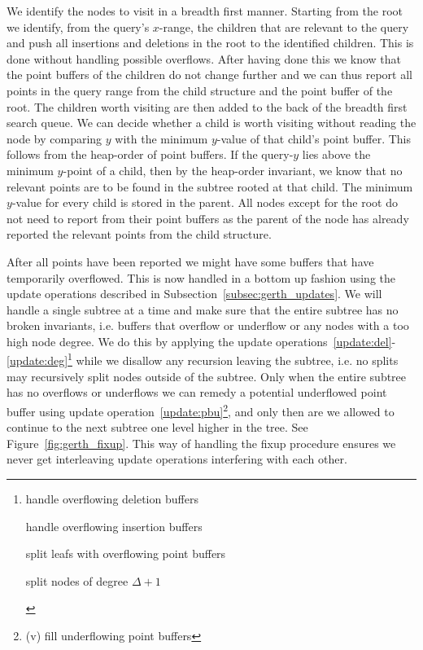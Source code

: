 \documentclass[twoside,11pt,openright]{report}
\begin{document}
We identify the nodes to visit in a breadth first manner.
Starting from the root we identify, from the query's $x$-range, the children that are relevant to the query and push all insertions and deletions in the root to the identified children. This is done without handling possible overflows. After having done this we know that the point buffers of the children do not change further and we can thus report all points in the query range from the child structure and the point buffer of the root. The children worth visiting are then added to the back of the breadth first search queue. We can decide whether a child is worth visiting without reading the node by comparing $y$ with the minimum $y$-value of that child's point buffer. This follows from the heap-order of point buffers. If the query-$y$ lies above the minimum $y$-point of a child, then by the heap-order invariant, we know that no relevant points are to be found in the subtree rooted at that child. The minimum $y$-value for every child is stored in the parent.
All nodes except for the root do not need to report from their point buffers as the parent of the node has already reported the relevant points from the child structure.

After all points have been reported we might have some buffers that have temporarily overflowed. This is now handled in a bottom up fashion using the update operations described in Subsection~\ref{subsec:gerth_updates}. We will handle a single subtree at a time and make sure that the entire subtree has no broken invariants, i.e. buffers that overflow or underflow or any nodes with a too high node degree. We do this by applying the update operations~\ref{update:del}-\ref{update:deg}\footnote{\begin{inlinelist}
	\item handle overflowing deletion buffers
	\item handle overflowing insertion buffers
	\item split leafs with overflowing point buffers
	\item split nodes of degree $\Delta+1$
\end{inlinelist}
} while we disallow any recursion leaving the subtree, i.e. no splits may recursively split nodes outside of the subtree. Only when the entire subtree has no overflows or underflows we can remedy a potential underflowed point buffer using update operation~\ref{update:pbu}\footnote{(v) fill underflowing point buffers}, and only then are we allowed to continue to the next subtree one level higher in the tree. See Figure~\ref{fig:gerth_fixup}. This way of handling the fixup procedure ensures we never get interleaving update operations interfering with each other.
\end{document}
